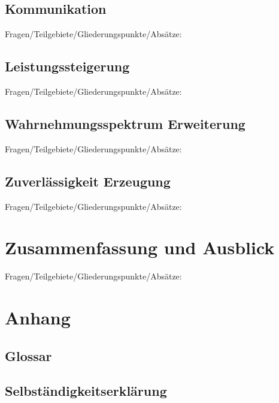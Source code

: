 \documentclass{llncs}					%
\begin{document}
\subsection{Kommunikation}
Fragen/Teilgebiete/Gliederungspunkte/Absätze:

\subsection{Leistungssteigerung}
Fragen/Teilgebiete/Gliederungspunkte/Absätze:

\subsection{Wahrnehmungsspektrum Erweiterung}
Fragen/Teilgebiete/Gliederungspunkte/Absätze:

\subsection{Zuverlässigkeit Erzeugung}
Fragen/Teilgebiete/Gliederungspunkte/Absätze:

\section{Zusammenfassung und Ausblick}
Fragen/Teilgebiete/Gliederungspunkte/Absätze:

\section{Anhang}

\clearpage
\subsection{Glossar}\label{glossar}

\renewcommand*{\glossarysection}[2][]{}	%
\printnoidxglossaries				%

\subsection{Selbständigkeitserklärung}

\clearpage

\end{document}
